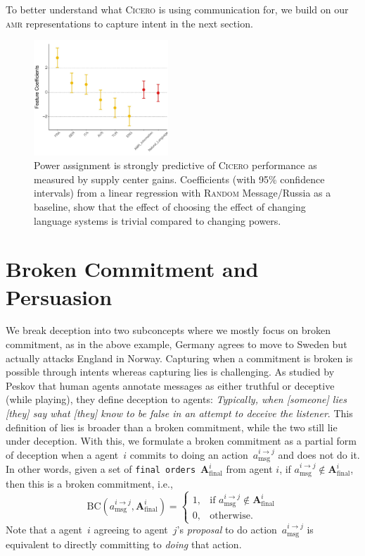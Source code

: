\documentclass[oneside]{memoir}
\newcommand{\cicero}{\abr{Cicero} }
\newcommand{\abr}[1]{\textsc{#1}}
\begin{document}
To better understand what \cicero{} is using communication for, we build on our \abr{amr} representations to capture intent in the next section.


\begin{figure}[t]
    \centering
    \includegraphics[width=0.45\textwidth]{figures/Feature_Coefficients_CC_final.pdf}
    \caption{Power assignment is strongly predictive of \cicero{} performance as measured by supply center gains. Coefficients (with 95\% confidence intervals) from a linear regression with \abr{Random} Message/Russia as a baseline, show that the effect of choosing the effect of changing language systems is trivial compared to changing powers.}
\label{fig:Feature_coef}
\end{figure}


\section{Broken Commitment and Persuasion}
\label{sec:detection}
We break deception into two subconcepts where we mostly focus on broken commitment, as in the above example, Germany agrees to move to Sweden but actually attacks England in Norway. Capturing when a commitment is broken is possible through intents whereas capturing lies is challenging. As studied by Peskov that human agents annotate messages as either truthful or deceptive (while playing), they define deception to agents: \textit{Typically, when [someone] lies [they] say what [they] know to be false in an attempt to deceive the listener}. This definition of lies is broader than a broken commitment, while the two still lie under deception. With this, we formulate a broken commitment as a partial form of deception when a agent~$i$ commits to doing an
action~$a^{i\to j}_{\text{msg}}$ and does not do it. In other words, given a set of \texttt{final orders}~$\mathbf{A}^{i}_{\text{final}}$ from agent $i$, 
if $a^{i\to j}_{\text{msg}} \notin \mathbf{A}^{i}_{\text{final}}$, then this is a broken commitment, i.e., 
\begin{equation}
    \text{BC}(a^{i\to j}_{\text{msg}},\mathbf{A}^{i}_{\text{final}}) = 
    \begin{cases}
        1,      & \text{if } a^{i\to j}_{\text{msg}} \notin \mathbf{A}^{i}_{\text{final}}\\
        0,      & \text{otherwise.}
    \end{cases}
    \label{eq:bc}
\end{equation}
Note that a agent~$i$ agreeing to 
agent~$j$'s \textit{proposal} to do
action~$a^{i\to j}_{\text{msg}}$ is equivalent to directly committing to \textit{doing} that
action.
\end{document}
